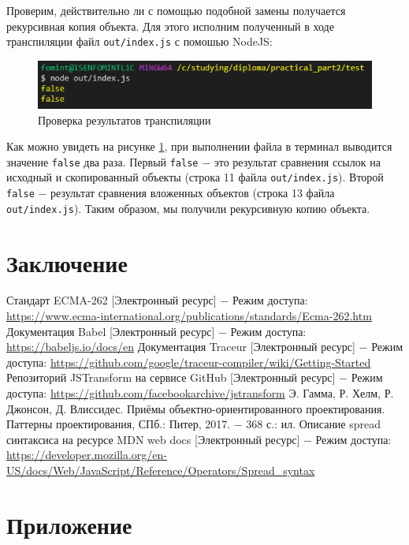 \documentclass[14pt, a4paper]{article}
\def\code#1{\texttt{#1}} %
\begin{document}
Проверим, действительно ли с помощью подобной замены получается рекурсивная копия объекта. Для этого
исполним полученный в ходе транспиляции файл \code{out/index.js} с помошью NodeJS:

\begin{figure}[H]
  \centering
  \includegraphics[scale=1.0]{img/test_results.PNG}
  \caption{Проверка результатов транспиляции}
  \label{test_results}
\end{figure}
Как можно увидеть на рисунке \ref{test_results}, при выполнении файла в терминал выводится значение 
\code{false} два раза. Первый \code{false} $-$ это результат сравнения ссылок на исходный и 
скопированный объекты (строка 11 файла \code{out/index.js}). Второй \code{false} $-$ результат сравнения
вложенных объектов (строка 13 файла \code{out/index.js}). Таким образом, мы получили рекурсивную копию
объекта. 


\pagebreak
\section{Заключение}
\pagebreak

\begin{thebibliography}{9}
   Стандарт ECMA-262 [Электронный ресурс] $-$ Режим доступа: \linebreak
    \url{https://www.ecma-international.org/publications/standards/Ecma-262.htm}
   Документация Babel [Электронный ресурс] $-$ Режим доступа: \linebreak
    \url{https://babeljs.io/docs/en}
   Документация Traceur [Электронный ресурс] $-$ Режим доступа: \linebreak
    \url{https://github.com/google/traceur-compiler/wiki/Getting-Started}
   Репозиторий JSTransform на сервисе GitHub [Электронный ресурс] $-$ Режим доступа:
    \url{https://github.com/facebookarchive/jstransform}
   Э. Гамма, Р. Хелм, Р. Джонсон, Д. Влиссидес. Приёмы объектно-ориентированного проектирования. Паттерны проектирования, СПб.: Питер, 2017. $-$ 368 с.: ил.
   Описание spread синтаксиса на ресурсе MDN web docs [Электронный ресурс] $-$ Режим доступа:
    \url{https://developer.mozilla.org/en-US/docs/Web/JavaScript/Reference/Operators/Spread_syntax}
\end{thebibliography}

\pagebreak
{}
\section*{Приложение}

\end{document}
